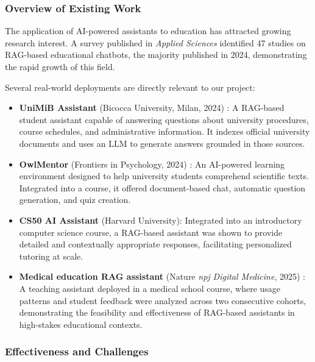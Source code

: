 \documentclass[a4paper,11pt]{article}
\begin{document}
\subsubsection{Overview of Existing Work}
 
The application of AI-powered assistants to education has attracted growing
research interest. A survey published in \emph{Applied Sciences}
\cite{mdpi2025rag} identified 47 studies on RAG-based educational chatbots,
the majority published in 2024, demonstrating the rapid growth of this field.
 
Several real-world deployments are directly relevant to our project:
 
\begin{itemize}
  \item \textbf{UniMiB Assistant} (Bicocca University, Milan, 2024)
    \cite{unimib2024}: A RAG-based student assistant capable of answering
    questions about university procedures, course schedules, and
    administrative information. It indexes official university documents and
    uses an LLM to generate answers grounded in those sources.
 
  \item \textbf{OwlMentor} (Frontiers in Psychology, 2024)
    \cite{owlmentor2024}: An AI-powered learning environment designed to help
    university students comprehend scientific texts. Integrated into a course,
    it offered document-based chat, automatic question generation, and quiz
    creation.
 
  \item \textbf{CS50 AI Assistant} (Harvard University): Integrated into an
    introductory computer science course, a RAG-based assistant was shown to
    provide detailed and contextually appropriate responses, facilitating
    personalized tutoring at scale.
 
  \item \textbf{Medical education RAG assistant} (Nature \emph{npj Digital
    Medicine}, 2025) \cite{npj2025}: A teaching assistant deployed in a
    medical school course, where usage patterns and student feedback were
    analyzed across two consecutive cohorts, demonstrating the feasibility and
    effectiveness of RAG-based assistants in high-stakes educational contexts.
\end{itemize}
 
\subsubsection{Effectiveness and Challenges}
 
\end{document}
